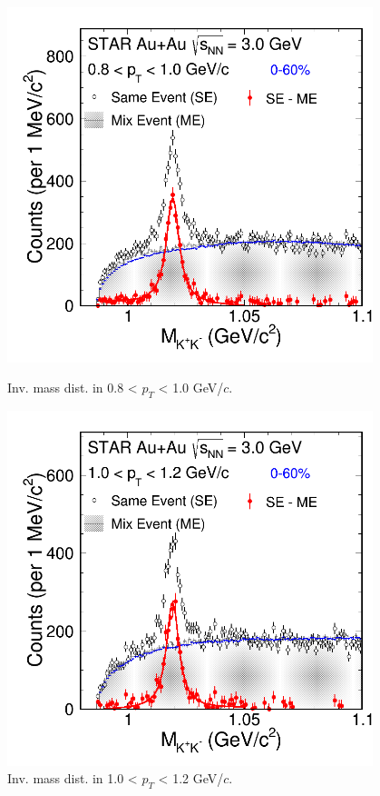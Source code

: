 \begin{figure}[htbp]
\begin{minipage}[htbp]{0.55\linewidth}
\centering
\includegraphics[width=0.95\textwidth]{chapterY/fig/fig1_signal_0_4.png}
\caption{Inv. mass dist. in 0.8 < $p_T$ < 1.0 GeV/$c$. \label{fig:mixedEvent_pT4}}
\end{minipage}
\hfill
\begin{minipage}[htbp]{0.55\linewidth}
\centering
\includegraphics[width=0.95\textwidth]{chapterY/fig/fig1_signal_0_5.png} 
\caption{Inv. mass dist. in 1.0 < $p_T$ < 1.2 GeV/$c$. \label{fig:mixedEvent_pT5}}
\end{minipage}
\end{figure}

